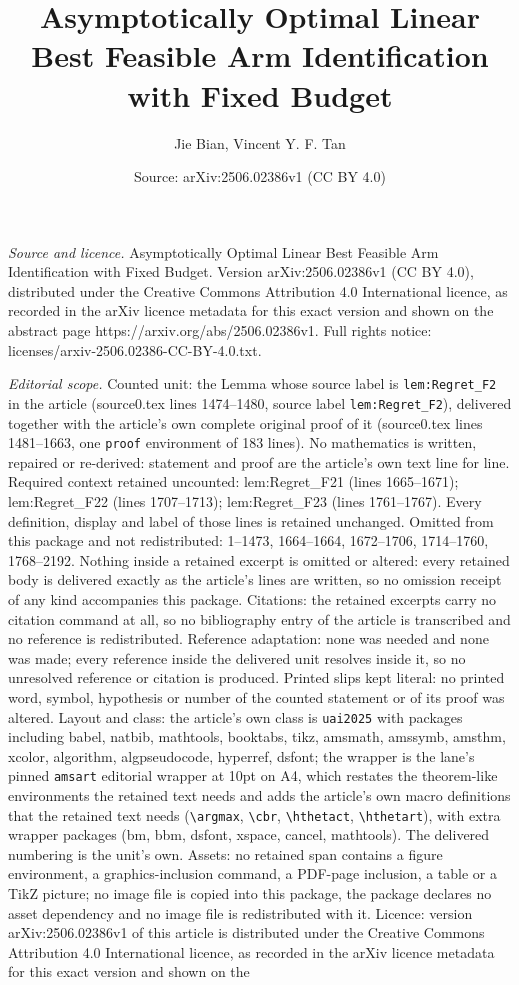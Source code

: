 \documentclass[10pt,a4paper]{amsart}
\title[Asymptotically Optimal Linear Best Feasible Arm Identificati]{Asymptotically Optimal Linear Best Feasible Arm Identification with Fixed Budget}
\author{Jie Bian, Vincent Y. F. Tan}
\date{Source: arXiv:2506.02386v1 (CC BY 4.0)}
\begin{document}
\maketitle

\noindent\emph{Source and licence.} Asymptotically Optimal Linear Best Feasible Arm Identification with Fixed Budget. Version arXiv:2506.02386v1 (CC BY 4.0), distributed under the Creative Commons Attribution 4.0 International licence, as recorded in the arXiv licence metadata for this exact version and shown on the abstract page https://arxiv.org/abs/2506.02386v1. Full rights notice: licenses/arxiv-2506.02386-CC-BY-4.0.txt.\par\smallskip

\noindent\textit{Editorial scope.} Counted unit: the Lemma whose source label is \texttt{lem:Regret\_F2} in the article (source0.tex lines 1474--1480, source label \texttt{lem:Regret\_F2}), delivered together with the article's own complete original proof of it (source0.tex lines 1481--1663, one \texttt{proof} environment of 183 lines). No mathematics is written, repaired or re-derived: statement and proof are the article's own text line for line. Required context retained uncounted: lem:Regret\_F21 (lines 1665--1671); lem:Regret\_F22 (lines 1707--1713); lem:Regret\_F23 (lines 1761--1767). Every definition, display and label of those lines is retained unchanged. Omitted from this package and not redistributed: 1--1473, 1664--1664, 1672--1706, 1714--1760, 1768--2192. Nothing inside a retained excerpt is omitted or altered: every retained body is delivered exactly as the article's lines are written, so no omission receipt of any kind accompanies this package. Citations: the retained excerpts carry no citation command at all, so no bibliography entry of the article is transcribed and no reference is redistributed. Reference adaptation: none was needed and none was made; every reference inside the delivered unit resolves inside it, so no unresolved reference or citation is produced. Printed slips kept literal: no printed word, symbol, hypothesis or number of the counted statement or of its proof was altered. Layout and class: the article's own class is \texttt{uai2025} with packages including babel, natbib, mathtools, booktabs, tikz, amsmath, amssymb, amsthm, xcolor, algorithm, algpseudocode, hyperref, dsfont; the wrapper is the lane's pinned \texttt{amsart} editorial wrapper at 10pt on A4, which restates the theorem-like environments the retained text needs and adds the article's own macro definitions that the retained text needs (\texttt{\textbackslash argmax}, \texttt{\textbackslash cbr}, \texttt{\textbackslash hthetact}, \texttt{\textbackslash hthetart}), with extra wrapper packages (bm, bbm, dsfont, xspace, cancel, mathtools). The delivered numbering is the unit's own. Assets: no retained span contains a figure environment, a graphics-inclusion command, a PDF-page inclusion, a table or a TikZ picture; no image file is copied into this package, the package declares no asset dependency and no image file is redistributed with it. Licence: version arXiv:2506.02386v1 of this article is distributed under the Creative Commons Attribution 4.0 International licence, as recorded in the arXiv licence metadata for this exact version and shown on the 
\end{document}
